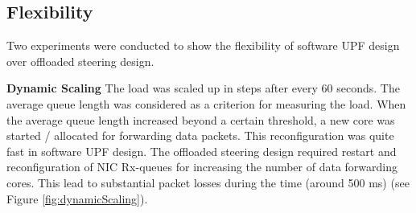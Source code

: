 \subsection{Flexibility}
Two experiments were conducted to show the flexibility of software UPF design over offloaded steering design.

\textbf{Dynamic Scaling} The load was scaled up in steps after every 60 seconds. The
average queue length was considered as a criterion for measuring the load. When the
average queue length increased beyond a certain threshold, a new core was started /
allocated for forwarding data packets. This reconfiguration was quite fast in software UPF design. The offloaded steering design required restart and reconfiguration of NIC Rx-queues for increasing the number of data forwarding cores. This lead to substantial
packet losses during the time (around 500 ms) (see Figure \ref{fig:dynamicScaling}).

